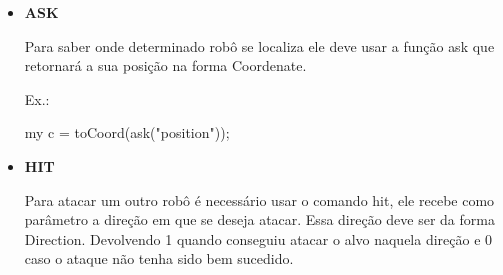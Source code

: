 \documentclass[a4paper]{article}
\begin{document}
{{{{\begin{itemize}
\begin{enumerate}
                hSquared = square(catA);
                
                \bigskip
                
                \item Para contruí-las basta usar  o tipo
                de retorno + o nome da função e entre
                parênteses os nomes dos parâmetros acompanhados de 
                seus respectivos tipos. Tudo isso seguido da ação que
                ela irá realizar entre chaves {}.
                
                Não esquecendo de dar
                \textcolor{NavyBlue}{return}
                nas funções que retornam algum tipo de dado.
                
                \textcolor{NavyBlue}{Ex.:}
                
                    number square(number x)
                    
                    \{
                    
                    \ \ \ \ my j = x;
                    
                    \ \ \ \ return x*j;
                    
                    \}
            \end{enumerate}
       
\newpage %
        
         
        \item \textbf{ASK}
        
            Para saber onde determinado robô se localiza
            ele deve usar a função 
            \textcolor{NavyBlue}{ask} 
            que retornará a sua posição na forma
            Coordenate.
        
            \textcolor{NavyBlue}{Ex.:}
        
            my c = toCoord(ask("position"));
        
        \bigskip
        
        \item \textbf{HIT}
            
            Para atacar um outro robô é necessário 
            usar o comando
            \textcolor{NavyBlue}{hit},
            ele recebe como parâmetro a direção em
            que se deseja atacar. 
            Essa direção deve ser da forma Direction.
            Devolvendo 1 quando conseguiu atacar o
            alvo naquela direção e 0 caso o ataque
            não tenha sido bem sucedido.
            

\end{itemize}}}}}
\end{document}
